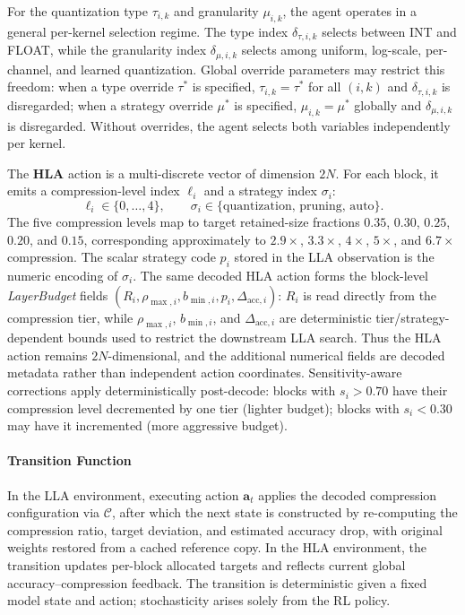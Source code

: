 \documentclass[preprint,12pt,authoryear]{elsarticle}
\begin{document}
For the quantization type $\tau_{i,k}$ and granularity $\mu_{i,k}$, the agent operates
in a general per-kernel selection regime. The type index $\delta_{\tau,i,k}$ selects
between INT and FLOAT, while the granularity index $\delta_{\mu,i,k}$ selects among
uniform, log-scale, per-channel, and learned quantization. Global override parameters
may restrict this freedom: when a type override $\tau^*$ is specified,
$\tau_{i,k}=\tau^*$ for all $(i,k)$ and $\delta_{\tau,i,k}$ is disregarded; when a
strategy override $\mu^*$ is specified, $\mu_{i,k}=\mu^*$ globally and
$\delta_{\mu,i,k}$ is disregarded. Without overrides, the agent selects both variables
independently per kernel.

The \textbf{HLA} action is a multi-discrete vector of dimension $2N$. For each block,
it emits a compression-level index $\ell_i$ and a strategy index $\sigma_i$:
\begin{equation}
    \ell_i \in \{0,\ldots,4\}, \qquad
    \sigma_i \in \{\text{quantization},\,\text{pruning},\,\text{auto}\}.
\end{equation}
The five compression levels map to target retained-size fractions $0.35$, $0.30$, $0.25$,
$0.20$, and $0.15$, corresponding approximately to $2.9\times$, $3.3\times$,
$4\times$, $5\times$, and $6.7\times$ compression. The scalar strategy code $p_i$
stored in the LLA observation is the numeric encoding of $\sigma_i$.
The same decoded HLA action forms the block-level \textit{LayerBudget} fields
$(R_i,\rho_{\max,i},b_{\min,i},p_i,\Delta_{\mathrm{acc},i})$: $R_i$ is read directly
from the compression tier, while $\rho_{\max,i}$, $b_{\min,i}$, and
$\Delta_{\mathrm{acc},i}$ are deterministic tier/strategy-dependent bounds used to
restrict the downstream LLA search. Thus the HLA action remains $2N$-dimensional, and
the additional numerical fields are decoded metadata rather than independent action
coordinates.
Sensitivity-aware corrections apply deterministically post-decode: blocks with
$s_i > 0.70$ have their compression level decremented by one tier (lighter budget);
blocks with $s_i < 0.30$ may have it incremented (more aggressive budget).

\paragraph{Transition Function}
In the LLA environment, executing action $\mathbf{a}_t$ applies the decoded compression
configuration via $\mathcal{C}$, after which the next state is constructed by
re-computing the compression ratio, target deviation, and estimated accuracy drop, with
original weights restored from a cached reference copy. In the HLA environment, the
transition updates per-block allocated targets and reflects current global
accuracy--compression feedback. The transition is deterministic given a fixed model
state and action; stochasticity arises solely from the RL policy.
\end{document}
